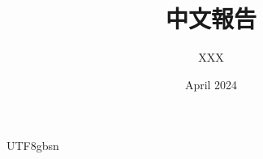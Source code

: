 \documentclass{article}
\title{中文報告}
\author{XXX}
\date{April 2024}
\begin{document}
\begin{CJK*}{UTF8}{gbsn}

\maketitle



\end{CJK*}
\end{document}

